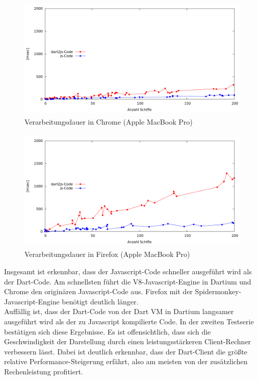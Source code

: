 \begin {figure}[H]
\begin{center}
  \includegraphics[height=2.3in]{images/ChromeOnMac.png}
\end{center}
 \caption{Verarbeitungsdauer in Chrome (Apple MacBook Pro)}
\end {figure}


\begin {figure}[H]
\begin{center}
  \includegraphics[height=2.3in]{images/FirefoxOnMac.png}
\end{center}
 \caption{Verarbeitungsdauer in Firefox (Apple MacBook Pro)}
\end {figure}

Insgesamt ist erkennbar, dass der Javascript-Code schneller ausgeführt wird als der Dart-Code. Am schnellsten führt die V8-Javascript-Engine in Dartium und Chrome den originären Javascript-Code aus. Firefox mit der Spidermonkey-Javascript-Engine benötigt deutlich länger.\\ Auffällig ist, dass der Dart-Code von der Dart VM in Dartium langsamer ausgeführt wird als der zu Javascript kompilierte Code.
In der zweiten Testserie bestätigen sich diese Ergebnisse. Es ist offensichtlich, dass sich die Geschwindigkeit der Darstellung durch einen leistungsstärkeren Client-Rechner verbessern lässt. Dabei ist deutlich erkennbar, dass der Dart-Client die größte relative Performance-Steigerung erfährt, also am meisten von der zusätzlichen Rechenleistung profitiert.

